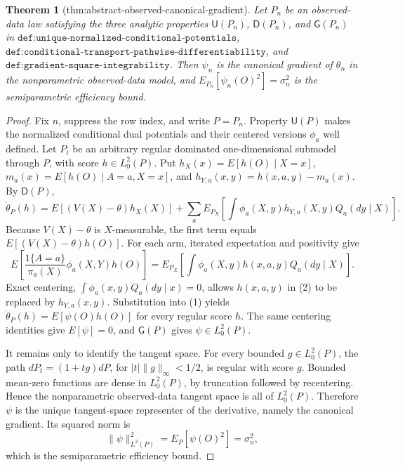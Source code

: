 \documentclass{article}
\newtheorem{theorem}{Theorem}
\begin{document}
\begin{theorem}[thm:abstract-observed-canonical-gradient]\label{thm:abstract-observed-canonical-gradient}
Let \(P_n\) be an observed-data law satisfying the three analytic properties \(\mathsf U(P_n)\), \(\mathsf D(P_n)\), and \(\mathsf G(P_n)\) in \(\texttt{def:unique-normalized-conditional-potentials}\), \(\texttt{def:conditional-transport-pathwise-differentiability}\), and \(\texttt{def:gradient-square-integrability}\). Then \(\psi_n\) is the canonical gradient of \(\theta_n\) in the nonparametric observed-data model, and \(E_{P_n}[\psi_n(O)^2]=\sigma_n^2\) is the semiparametric efficiency bound.
\end{theorem}
\begin{proof}
Fix \(n\), suppress the row index, and write \(P=P_n\). Property \(\mathsf U(P)\) makes the normalized conditional dual potentials and their centered versions \(\phi_a\) well defined. Let \(P_t\) be an arbitrary regular dominated one-dimensional submodel through \(P\), with score \(h\in L_0^2(P)\). Put \(h_X(x)=E[h(O)\mid X=x]\), \(m_a(x)=E[h(O)\mid A=a,X=x]\), and \(h_{Y,a}(x,y)=h(x,a,y)-m_a(x)\). By \(\mathsf D(P)\),
\[\dot\theta_P(h)=E[(V(X)-\theta)h_X(X)]+\sum_aE_{P_X}\!\left[\int\phi_a(X,y)h_{Y,a}(X,y)Q_a(dy\mid X)\right].\tag{1}\]
Because \(V(X)-\theta\) is \(X\)-measurable, the first term equals \(E[(V(X)-\theta)h(O)]\). For each arm, iterated expectation and positivity give
\[E\!\left[\frac{1\{A=a\}}{\pi_a(X)}\phi_a(X,Y)h(O)\right]=E_{P_X}\!\left[\int\phi_a(X,y)h(x,a,y)Q_a(dy\mid X)\right].\tag{2}\]
Exact centering, \(\int\phi_a(x,y)Q_a(dy\mid x)=0\), allows \(h(x,a,y)\) in (2) to be replaced by \(h_{Y,a}(x,y)\). Substitution into (1) yields \(\dot\theta_P(h)=E[\psi(O)h(O)]\) for every regular score \(h\). The same centering identities give \(E[\psi]=0\), and \(\mathsf G(P)\) gives \(\psi\in L_0^2(P)\).

It remains only to identify the tangent space. For every bounded \(g\in L_0^2(P)\), the path \(dP_t=(1+tg)dP\), for \(|t|\lVert g\rVert_\infty<1/2\), is regular with score \(g\). Bounded mean-zero functions are dense in \(L_0^2(P)\), by truncation followed by recentering. Hence the nonparametric observed-data tangent space is all of \(L_0^2(P)\). Therefore \(\psi\) is the unique tangent-space representer of the derivative, namely the canonical gradient. Its squared norm is
\[\lVert\psi\rVert_{L^2(P)}^2=E_P[\psi(O)^2]=\sigma_n^2,\]
which is the semiparametric efficiency bound.
\end{proof}
\end{document}
